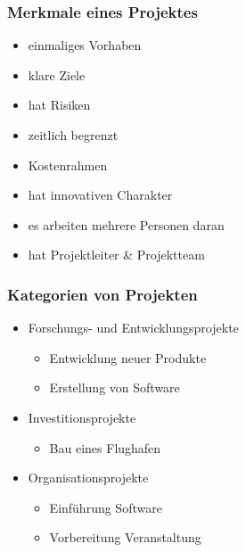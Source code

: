 \begin{multicols}{2}
	\subsubsection{Merkmale eines Projektes}
	\begin{itemize}
		\item einmaliges Vorhaben
		\item klare Ziele
		\item hat Risiken
		\item zeitlich begrenzt
		\item Kostenrahmen
		\item hat innovativen Charakter
		\item es arbeiten mehrere Personen daran
		\item hat Projektleiter \& Projektteam 
	\end{itemize} 
	
	
	\subsubsection{Kategorien von Projekten}
	\begin{itemize}
		\item Forschungs- und Entwicklungsprojekte
		\begin{itemize}
			\item  Entwicklung neuer Produkte
			\item  Erstellung von Software
		\end{itemize}			 
		\item Investitionsprojekte
		\begin{itemize}
			\item Bau eines Flughafen			
		\end{itemize}
		\item Organisationsprojekte
		\begin{itemize}
			\item Einführung Software
			\item Vorbereitung Veranstaltung
		\end{itemize}
	\end{itemize}
\end{multicols}

